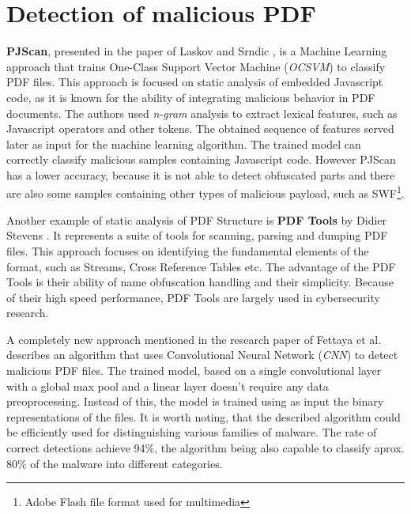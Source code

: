 

\section{Detection of malicious PDF}
\label{section:relatedWorkML}
\textbf{PJScan}, presented in the paper of Laskov and Srndic \cite{pjscan}, is a Machine Learning approach that trains One-Class Support Vector Machine (\textit{OCSVM}) to classify PDF files. This approach is focused on static analysis of embedded Javascript code, as it is known for the ability of integrating malicious behavior in PDF documents. The authors used \textit{n-gram} analysis to extract lexical features, such as Javascript operators and other tokens. The obtained sequence of features served later as input for the machine learning algorithm. The trained model can correctly classify malicious samples containing Javascript code. However PJScan has a lower accuracy, because it is not able to detect obfuscated parts and there are also some samples containing other types of malicious payload, such as SWF\footnote{Adobe Flash file format used for multimedia}. \par
Another example of static analysis of PDF Structure is \textbf{PDF Tools} by Didier Stevens \cite{pdftools}. It represents a suite of tools for scanning, parsing and dumping PDF files. This approach focuses on identifying the fundamental elements of the format, such as Streams, Cross Reference Tables etc. The advantage of the PDF Tools is their ability of name obfuscation handling and their simplicity. Because of their high speed performance, PDF Tools are largely used in cybersecurity research. \par
A completely new approach mentioned in the research paper of Fettaya et al. \cite{deepdf} describes an algorithm that uses Convolutional Neural Network (\textit{CNN}) to detect malicious PDF files. The trained model, based on a single convolutional layer with a global max pool and a linear layer doesn't require any data preoprocessing. Instead of this, the model is trained using as input the binary representations of the files. It is worth noting, that the described algorithm could be efficiently used for distinguishing various families of malware. The rate of correct detections achieve 94\%, the algorithm being also capable to classify aprox. 80\% of the malware into different categories.
